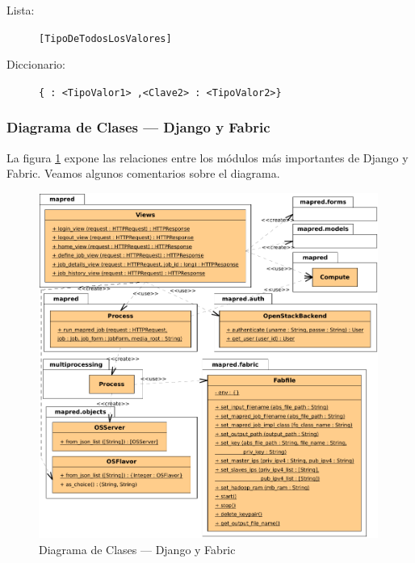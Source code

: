 \begin{description}
 \item[Lista:] \texttt{[TipoDeTodosLosValores]}
 \item[Diccionario:] \texttt{\{<Clave1> : <TipoValor1> ,<Clave2> : <TipoValor2>\}}
\end{description}


\subsubsection{Diagrama de Clases --- Django y Fabric}\label{subsubsec:clasesdjangofabric}
\noindent La figura \ref{fig:djangoyfabric} expone las relaciones entre los m\'odulos m\'as importantes de Django y Fabric. Veamos algunos comentarios sobre el diagrama.

\begin{figure}[tbp]
\begin{center}
\includegraphics[width=0.99\textwidth]{imagenes/029.pdf}
 \caption{Diagrama de Clases --- Django y Fabric}
\label{fig:djangoyfabric}
\end{center}
\end{figure}

